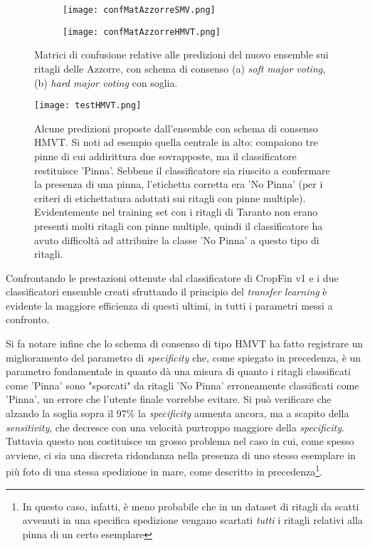 \begin{figure}[h!]

  \centering
  
  \begin{subfigure}[b]{0.45\textwidth}
  \raggedright
    \texttt{[image: confMatAzzorreSMV.png]}
    \caption{}
  \end{subfigure}
  \begin{subfigure}[b]{0.45\textwidth}
  \raggedleft
    \texttt{[image: confMatAzzorreHMVT.png]}
    \caption{}
  \end{subfigure}
  
  \caption{Matrici di confusione relative alle predizioni del nuovo ensemble sui ritagli delle Azzorre, con schema di consenso (a) \textit{soft major voting}, (b) \textit{hard major voting} con soglia.}
  \label{fig:confMatEnsemble}
\end{figure}


\begin{figure}[h]
\centering
\texttt{[image: testHMVT.png]}
\caption{Alcune predizioni proposte dall'ensemble con schema di consenso HMVT. Si noti ad esempio quella centrale in alto: compaiono tre pinne di cui addirittura due sovrapposte, ma il classificatore restituisce 'Pinna'. Sebbene il classificatore sia riuscito a confermare la presenza di una pinna, l'etichetta corretta era 'No Pinna' (per i criteri di etichettatura adottati sui ritagli con pinne multiple). Evidentemente nel training set con i ritagli di Taranto non erano presenti molti ritagli con pinne multiple, quindi il classificatore ha avuto difficoltà ad attribuire la classe 'No Pinna' a questo tipo di ritagli.}
\label{testHMVT}
\end{figure}


Confrontando le prestazioni ottenute dal classificatore di CropFin v1 e i due classificatori ensemble creati sfruttando il principio del \textit{transfer learning} è evidente la maggiore efficienza di questi ultimi, in tutti i parametri messi a confronto.

Si fa notare infine che lo schema di consenso di tipo HMVT ha fatto registrare un miglioramento del parametro di \textit{specificity} che, come spiegato in precedenza, è un parametro fondamentale in quanto dà una misura di quanto i ritagli classificati come 'Pinna' sono "sporcati" da ritagli 'No Pinna' erroneamente classificati come 'Pinna', un errore che l'utente finale vorrebbe evitare. Si può verificare che alzando la soglia sopra il 97\% la \textit{specificity} aumenta ancora, ma a scapito della \textit{sensitivity}, che decresce con una velocità purtroppo maggiore della \textit{specificity}. Tuttavia questo non costituisce un grosso problema nel caso in cui, come spesso avviene, ci sia una discreta ridondanza nella presenza di uno stesso esemplare in più foto di una stessa spedizione in mare, come descritto in precedenza\footnote{In questo caso, infatti, è meno probabile che in un dataset di ritagli da scatti avvenuti in una specifica spedizione vengano scartati \emph{tutti} i ritagli relativi alla pinna di un certo esemplare}.

